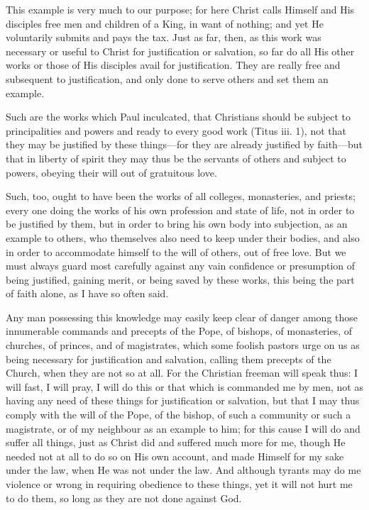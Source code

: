 This example is very much to our purpose; for here Christ calls Himself
and His disciples free men and children of a King, in want of nothing; and
yet He voluntarily submits and pays the tax. Just as far, then, as this
work was necessary or useful to Christ for justification or salvation, so
far do all His other works or those of His disciples avail for
justification. They are really free and subsequent to justification, and
only done to serve others and set them an example.

Such are the works which Paul inculcated, that Christians should be
subject to principalities and powers and ready to every good work (Titus
iii. 1), not that they may be justified by these things—for they are
already justified by faith—but that in liberty of spirit they may
thus be the servants of others and subject to powers, obeying their will
out of gratuitous love.

Such, too, ought to have been the works of all colleges, monasteries, and
priests; every one doing the works of his own profession and state of
life, not in order to be justified by them, but in order to bring his own
body into subjection, as an example to others, who themselves also need to
keep under their bodies, and also in order to accommodate himself to the
will of others, out of free love. But we must always guard most carefully
against any vain confidence or presumption of being justified, gaining
merit, or being saved by these works, this being the part of faith alone,
as I have so often said.

Any man possessing this knowledge may easily keep clear of danger among
those innumerable commands and precepts of the Pope, of bishops, of
monasteries, of churches, of princes, and of magistrates, which some
foolish pastors urge on us as being necessary for justification and
salvation, calling them precepts of the Church, when they are not so at
all. For the Christian freeman will speak thus: I will fast, I will pray,
I will do this or that which is commanded me by men, not as having any
need of these things for justification or salvation, but that I may thus
comply with the will of the Pope, of the bishop, of such a community or
such a magistrate, or of my neighbour as an example to him; for this cause
I will do and suffer all things, just as Christ did and suffered much more
for me, though He needed not at all to do so on His own account, and made
Himself for my sake under the law, when He was not under the law. And
although tyrants may do me violence or wrong in requiring obedience to
these things, yet it will not hurt me to do them, so long as they are not
done against God.

